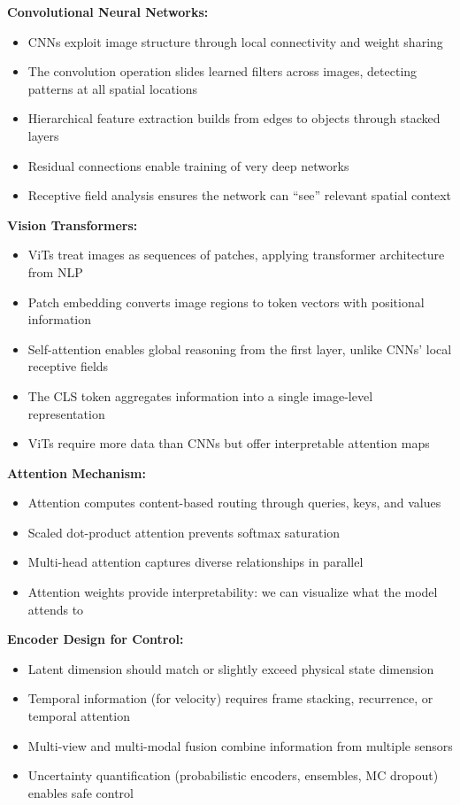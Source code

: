\textbf{Convolutional Neural Networks:}
\begin{itemize}
    \item CNNs exploit image structure through local connectivity and weight sharing
    \item The convolution operation slides learned filters across images, detecting patterns at all spatial locations
    \item Hierarchical feature extraction builds from edges to objects through stacked layers
    \item Residual connections enable training of very deep networks
    \item Receptive field analysis ensures the network can ``see'' relevant spatial context
\end{itemize}

\textbf{Vision Transformers:}
\begin{itemize}
    \item ViTs treat images as sequences of patches, applying transformer architecture from NLP
    \item Patch embedding converts image regions to token vectors with positional information
    \item Self-attention enables global reasoning from the first layer, unlike CNNs' local receptive fields
    \item The CLS token aggregates information into a single image-level representation
    \item ViTs require more data than CNNs but offer interpretable attention maps
\end{itemize}

\textbf{Attention Mechanism:}
\begin{itemize}
    \item Attention computes content-based routing through queries, keys, and values
    \item Scaled dot-product attention prevents softmax saturation
    \item Multi-head attention captures diverse relationships in parallel
    \item Attention weights provide interpretability: we can visualize what the model attends to
\end{itemize}

\textbf{Encoder Design for Control:}
\begin{itemize}
    \item Latent dimension should match or slightly exceed physical state dimension
    \item Temporal information (for velocity) requires frame stacking, recurrence, or temporal attention
    \item Multi-view and multi-modal fusion combine information from multiple sensors
    \item Uncertainty quantification (probabilistic encoders, ensembles, MC dropout) enables safe control
\end{itemize}

